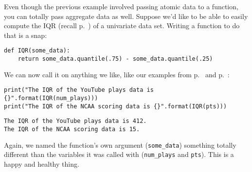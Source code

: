 
Even though the previous example involved passing atomic data to a function,
you can totally pass aggregate data as well. Suppose we'd like to be able to
easily compute the IQR (recall p.~\pageref{IQR}) of a univariate data set.
Writing a function to do that is a snap:

\begin{Verbatim}[fontsize=\small,samepage=true,frame=single,framesep=3mm]
def IQR(some_data):
    return some_data.quantile(.75) - some_data.quantile(.25)
\end{Verbatim}

We can now call it on anything we like, like our examples from
p.~\pageref{YouTubeData} and p.~\pageref{NCAAData}:

\begin{Verbatim}[fontsize=\small,samepage=true,frame=single,framesep=3mm]
print("The IQR of the YouTube plays data is {}".format(IQR(num_plays)))
print("The IQR of the NCAA scoring data is {}".format(IQR(pts)))
\end{Verbatim}
\vspace{-.2in}

\begin{Verbatim}[fontsize=\small,samepage=true,frame=leftline,framesep=5mm,framerule=1mm]
The IQR of the YouTube plays data is 412.
The IQR of the NCAA scoring data is 15.
\end{Verbatim}

Again, we named the function's own argument (\texttt{some\_data}) something
totally different than the variables it was called with (\texttt{num\_plays}
and \texttt{pts}). This is a happy and healthy thing.



